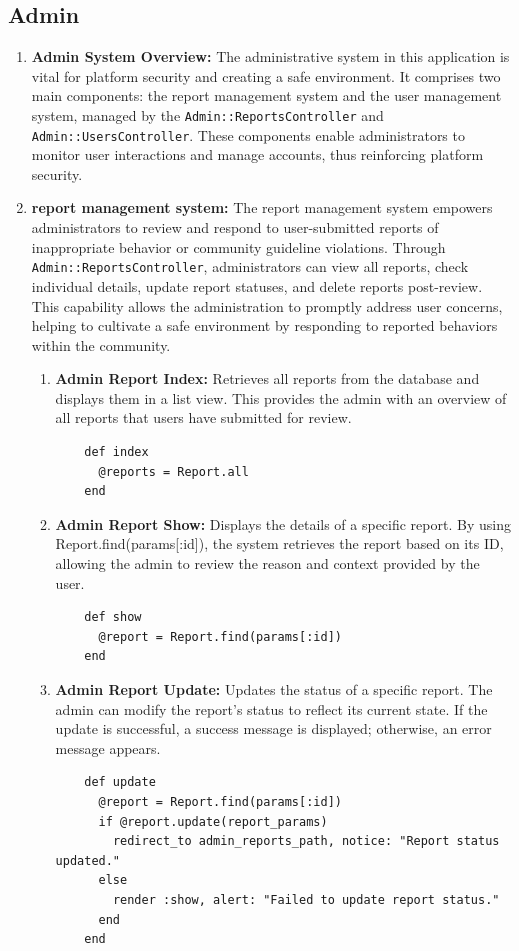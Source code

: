     \subsection{Admin}
    \begin{enumerate}
        \item \textbf{Admin System Overview:} 
        The administrative system in this application is vital for platform security and creating a safe environment. It comprises two main components: the report management system and the user management system, managed by the \texttt{Admin::ReportsController} and \texttt{Admin::UsersController}. These components enable administrators to monitor user interactions and manage accounts, thus reinforcing platform security.


        \item \textbf{report management system:} 
        The report management system empowers administrators to review and respond to user-submitted reports of inappropriate behavior or community guideline violations. Through \texttt{Admin::ReportsController}, administrators can view all reports, check individual details, update report statuses, and delete reports post-review. This capability allows the administration to promptly address user concerns, helping to cultivate a safe environment by responding to reported behaviors within the community.
            \begin{enumerate}
            \item \textbf{Admin Report Index:} 
            Retrieves all reports from the database and displays them in a list view. This provides the admin with an overview of all reports that users have submitted for review.
            \begin{lstlisting}
    def index
      @reports = Report.all
    end
            \end{lstlisting}
            
            \item \textbf{Admin Report Show:} 
            Displays the details of a specific report. By using Report.find(params[:id]), the system retrieves the report based on its ID, allowing the admin to review the reason and context provided by the user.
            \begin{lstlisting}
    def show
      @report = Report.find(params[:id])
    end
            \end{lstlisting}

            \newpage
            \item \textbf{Admin Report Update:} 
            Updates the status of a specific report. The admin can modify the report’s status to reflect its current state. If the update is successful, a success message is displayed; otherwise, an error message appears.
            \begin{lstlisting}
    def update
      @report = Report.find(params[:id])
      if @report.update(report_params)
        redirect_to admin_reports_path, notice: "Report status updated."
      else
        render :show, alert: "Failed to update report status."
      end
    end
            \end{lstlisting}
            

\end{enumerate}
\end{enumerate}
